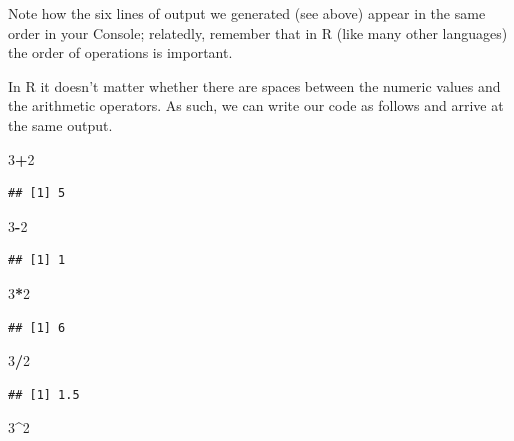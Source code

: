 \documentclass[]{book}
\newenvironment{Shaded}{\begin{snugshade}}{\end{snugshade}}
\newcommand{\DecValTok}[1]{\textcolor[rgb]{0.00,0.00,0.81}{#1}}
\newcommand{\OperatorTok}[1]{\textcolor[rgb]{0.81,0.36,0.00}{\textbf{#1}}}
\begin{document}
Note how the six lines of output we generated (see above) appear in the
same order in your Console; relatedly, remember that in R (like many
other languages) the order of operations is important.

In R it doesn't matter whether there are spaces between the numeric
values and the arithmetic operators. As such, we can write our code as
follows and arrive at the same output.

\begin{Shaded}
\begin{Highlighting}[]
\DecValTok{3}\OperatorTok{+}\DecValTok{2}
\end{Highlighting}
\end{Shaded}

\begin{verbatim}
## [1] 5
\end{verbatim}

\begin{Shaded}
\begin{Highlighting}[]
\DecValTok{3}\OperatorTok{-}\DecValTok{2}
\end{Highlighting}
\end{Shaded}

\begin{verbatim}
## [1] 1
\end{verbatim}

\begin{Shaded}
\begin{Highlighting}[]
\DecValTok{3}\OperatorTok{*}\DecValTok{2}
\end{Highlighting}
\end{Shaded}

\begin{verbatim}
## [1] 6
\end{verbatim}

\begin{Shaded}
\begin{Highlighting}[]
\DecValTok{3}\OperatorTok{/}\DecValTok{2}
\end{Highlighting}
\end{Shaded}

\begin{verbatim}
## [1] 1.5
\end{verbatim}

\begin{Shaded}
\begin{Highlighting}[]
\DecValTok{3}\OperatorTok{^}\DecValTok{2}
\end{Highlighting}
\end{Shaded}
\end{document}
